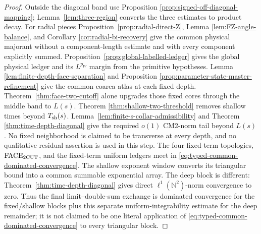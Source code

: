\documentclass[11pt]{article}
\begin{document}
\begin{proof}
Outside the diagonal band use Proposition
\ref{prop:signed-off-diagonal-mapping};
Lemma~\ref{lem:three-region} converts the three estimates to product decay.
For radial pieces Proposition~\ref{prop:radial-direct-Z}, Lemma
\ref{lem:FZ-angle-balance}, and Corollary
\ref{cor:radial-bi-recovery} give the common physical majorant without a
component-length estimate and with every component explicitly summed.
Proposition~\ref{prop:global-labelled-ledger} gives the global physical
ledger and its $L^{p_W}$ margin from the primitive hypotheses.  Lemma
\ref{lem:finite-depth-face-separation} and Proposition
\ref{prop:parameter-state-master-refinement} give the common coarea atlas at
each fixed depth.  Theorem~\ref{thm:face-two-cutoff} alone upgrades those
fixed cores through the middle band to $L(s)$.  Theorem
\ref{thm:shallow-two-threshold} removes shallow times beyond
$T_{\rm sh}(s)$.  Lemma~\ref{lem:finite-s-collar-admissibility} and Theorem
\ref{thm:time-depth-diagonal} give the required $o(1)$ CM2-norm tail beyond
$L(s)$.  No fixed neighborhood is
claimed to be transverse at every depth, and no qualitative residual
assertion is used in this step.  The four fixed-term topologies,
$\mathrm{FACE}_{\rm 2CUT}$, and the fixed-term uniform ledgers meet in
\eqref{eq:typed-common-dominated-convergence}.  The shallow exponent window
converts its triangular bound into a common summable exponential array.
The deep block is different: Theorem~\ref{thm:time-depth-diagonal} gives
direct $\ell^1(\mathbb N^2)$-norm convergence to zero.  Thus the final
limit--double-sum exchange is dominated convergence for the fixed/shallow
blocks plus this separate uniform-integrability estimate for the deep
remainder; it is not claimed to be one literal application of
\eqref{eq:typed-common-dominated-convergence} to every triangular block.
\end{proof}
\end{document}
